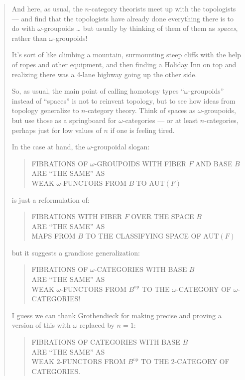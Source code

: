 \documentclass{article}
\begin{document}
\begin{quote}
And here, as usual, the \(n\)-category theorists meet up with the
topologists --- and find that the topologists have already done
everything there is to do with \(\omega\)-groupoids \ldots{} but usually
by thinking of them of them as \emph{spaces}, rather than
\(\omega\)-groupoids!

It's sort of like climbing a mountain, surmounting steep cliffs with the
help of ropes and other equipment, and then finding a Holiday Inn on top
and realizing there was a 4-lane highway going up the other side.

So, as usual, the main point of calling homotopy types
``\(\omega\)-groupoids'' instead of ``spaces'' is not to reinvent
topology, but to see how ideas from topology generalize to
\(n\)-category theory. Think of spaces as \(\omega\)-groupoids, but use
those as a springboard for \(\omega\)-categories --- or at least
\(n\)-categories, perhaps just for low values of \(n\) if one is feeling
tired.

In the case at hand, the \(\omega\)-groupoidal slogan:

\begin{quote}
FIBRATIONS OF \(\omega\)-GROUPOIDS WITH FIBER \(F\) AND BASE \(B\)\\
ARE ``THE SAME'' AS\\
WEAK \(\omega\)-FUNCTORS FROM \(B\) TO \(\mathrm{AUT}(F)\)
\end{quote}

is just a reformulation of:

\begin{quote}
FIBRATIONS WITH FIBER \(F\) OVER THE SPACE \(B\)\\
ARE ``THE SAME'' AS\\
MAPS FROM \(B\) TO THE CLASSIFYING SPACE OF \(\mathrm{AUT}(F)\)
\end{quote}

but it suggests a grandiose generalization:

\begin{quote}
FIBRATIONS OF \(\omega\)-CATEGORIES WITH BASE \(B\)\\
ARE ``THE SAME'' AS\\
WEAK \(\omega\)-FUNCTORS FROM \(B^{\mathrm{op}}\) TO THE
\(\omega\)-CATEGORY OF \(\omega\)-CATEGORIES!
\end{quote}

I guess we can thank Grothendieck for making precise and proving a
version of this with \(\omega\) replaced by \(n = 1\):

\begin{quote}
FIBRATIONS OF CATEGORIES WITH BASE \(B\)\\
ARE ``THE SAME'' AS\\
WEAK \(2\)-FUNCTORS FROM \(B^{\mathrm{op}}\) TO THE \(2\)-CATEGORY OF
CATEGORIES.
\end{quote}


\end{quote}
\end{document}
